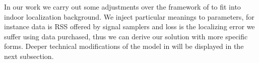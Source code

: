 \documentclass[10pt,conference,compsocconf,letterpaper]{IEEEtran}
\begin{document}
In our work we carry out some adjustments over the framework of \cite{abernethy2015low} to fit into indoor localization background. We inject particular meanings to parameters, for instance data is RSS offered by signal samplers%
and loss is the localizing error we suffer using data purchased, thus we can derive our solution with more specific forms. %
Deeper technical modifications of the model in \cite{abernethy2015low} will be displayed in the next subsection.
%
%
%
\end{document}
